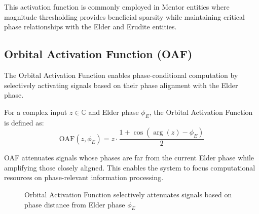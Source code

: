 This activation function is commonly employed in Mentor entities where magnitude thresholding provides beneficial sparsity while maintaining critical phase relationships with the Elder and Erudite entities.

\subsection{Orbital Activation Function (OAF)}

The Orbital Activation Function enables phase-conditional computation by selectively activating signals based on their phase alignment with the Elder phase.

\begin{definition}
For a complex input $z \in \mathbb{C}$ and Elder phase $\phi_E$, the Orbital Activation Function is defined as:
\begin{equation}
\text{OAF}(z, \phi_E) = z \cdot \frac{1 + \cos(\arg(z) - \phi_E)}{2}
\end{equation}
\end{definition}

OAF attenuates signals whose phases are far from the current Elder phase while amplifying those closely aligned. This enables the system to focus computational resources on phase-relevant information processing.

\begin{figure}[h]
\centering
{}
\caption{Orbital Activation Function selectively attenuates signals based on phase distance from Elder phase $\phi_E$}
\end{figure}

